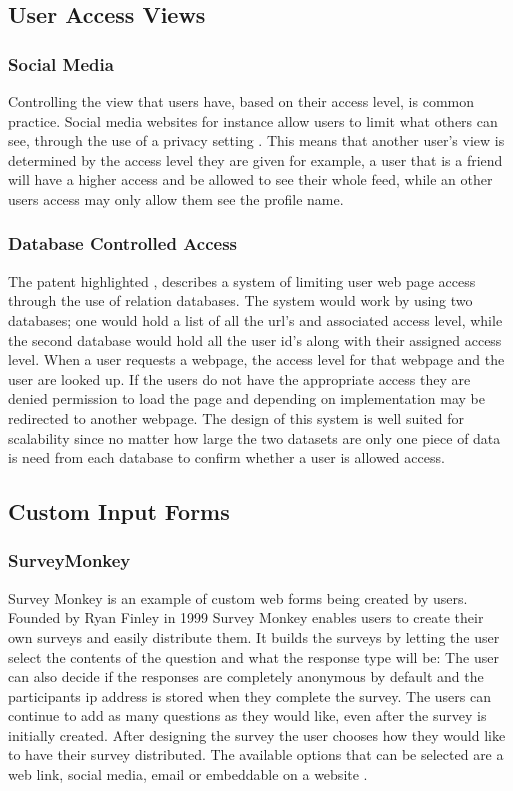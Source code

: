 \documentclass[12pt]{article}  %
\begin{document}
\subsection{User Access Views}

\subsubsection{Social Media}
Controlling the view that users have, based on their access level, is common practice. Social media websites for instance allow users to limit what others  can see, through the use of a privacy setting \cite{tufekci_can_2008}. This means that another user's view is determined by the access level they are given for example, a user that is a friend will have a higher access and be allowed to see their whole feed, while an other users access may only allow them see the profile name.

\subsubsection{Database Controlled Access}
The patent highlighted \cite{baker_system_1997}, describes a system of limiting user web page access through the use of relation databases. The system would work by using two databases; one would hold a list of all the url's and associated access level, while the second database would hold all the user id's along with their assigned access level. When a user requests a webpage, the access level for that webpage and the user are looked up. If the users do not have the appropriate access they are denied permission to load the page and depending on implementation may be redirected to another webpage.
The design of this system is well suited for scalability since no matter how large the two datasets are only one piece of data is need from each database to confirm whether a user is allowed access.


\subsection{Custom Input Forms}

\subsubsection{SurveyMonkey}
Survey Monkey \cite{finley_surveymonkey_1999} is an example of custom web forms being created by users. Founded by Ryan Finley in 1999 Survey Monkey enables users to create their own surveys and easily distribute them. It builds the surveys by letting the user select the contents of the question and what the response type will be: The user can also decide if the responses are completely anonymous by default and the participants ip address is stored when they complete the survey. The users can continue to add as many questions as they would like, even after the survey is initially created. After designing the survey the user chooses how they would like to have their survey distributed. The available options that can be selected are a web link, social media, email or embeddable on a website \cite{waclawski_how_2012} .
\end{document}

